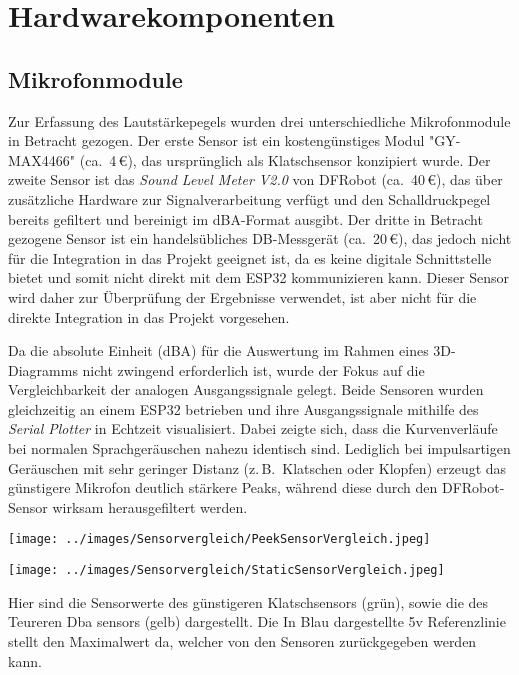 \chapter{Hardwarekomponenten}

\section{Mikrofonmodule}

Zur Erfassung des Lautstärkepegels wurden drei unterschiedliche Mikrofonmodule in Betracht gezogen. 
Der erste Sensor ist ein kostengünstiges Modul "GY-MAX4466" (ca.\ 4\,€), das ursprünglich als Klatschsensor konzipiert wurde. 
Der zweite Sensor ist das \textit{Sound Level Meter V2.0} von DFRobot (ca.\ 40\,€), das über zusätzliche Hardware zur Signalverarbeitung verfügt und den Schalldruckpegel bereits gefiltert und bereinigt im dBA-Format ausgibt.
Der dritte in Betracht gezogene Sensor ist ein handelsübliches DB-Messgerät (ca.\ 20\,€), das jedoch nicht für die Integration in das Projekt geeignet ist, da es keine digitale Schnittstelle bietet und somit nicht direkt mit dem ESP32 kommunizieren kann.
Dieser Sensor wird daher zur Überprüfung der Ergebnisse verwendet, ist aber nicht für die direkte Integration in das Projekt vorgesehen.

Da die absolute Einheit (dBA) für die Auswertung im Rahmen eines 3D-Diagramms nicht zwingend erforderlich ist, wurde der Fokus auf die Vergleichbarkeit der analogen Ausgangssignale gelegt. 
Beide Sensoren wurden gleichzeitig an einem ESP32 betrieben und ihre Ausgangssignale mithilfe des \textit{Serial Plotter} in Echtzeit visualisiert. 
Dabei zeigte sich, dass die Kurvenverläufe bei normalen Sprachgeräuschen nahezu identisch sind. 
Lediglich bei impulsartigen Geräuschen mit sehr geringer Distanz (z.\,B.\ Klatschen oder Klopfen) erzeugt das günstigere Mikrofon deutlich stärkere Peaks, während diese durch den DFRobot-Sensor wirksam herausgefiltert werden.

\begin{center}
  \texttt{[image: ../images/Sensorvergleich/PeekSensorVergleich.jpeg]}
\end{center}
\begin{center}
  \texttt{[image: ../images/Sensorvergleich/StaticSensorVergleich.jpeg]}
\end{center}

Hier sind die Sensorwerte des günstigeren Klatschsensors (grün), sowie die des Teureren Dba sensors (gelb) dargestellt. Die In Blau dargestellte 5v Referenzlinie stellt den Maximalwert da, welcher von den Sensoren zurückgegeben werden kann.

